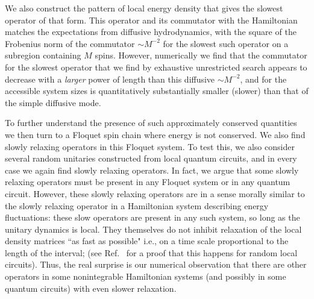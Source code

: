 \documentclass[twocolumn,superscriptaddress, prb]{revtex4-1}
\begin{document}
We also construct the pattern of local energy density that gives the slowest operator of that form.  This operator and its commutator with the Hamiltonian
matches the expectations from diffusive hydrodynamics, with the square of the Frobenius norm of the commutator $\sim M^{-2}$ for the slowest such operator on a subregion containing $M$ spins.
However, numerically we find that the commutator for the slowest operator that we find by exhaustive unrestricted search appears to decrease with a {\it larger} power of length than this diffusive $\sim M^{-2}$, and for the accessible system sizes is quantitatively substantially smaller (slower) than that of the simple diffusive mode.

To further understand the presence of such approximately conserved quantities we then turn to a Floquet spin chain where energy is not conserved.
We also find slowly relaxing operators in this Floquet system.
To test this, we also consider several random unitaries constructed from local quantum circuits, and in every case we again find slowly relaxing operators.
In fact, we argue that some slowly relaxing operators must be present in any Floquet system or in any quantum circuit.
However, these slowly relaxing operators are in a sense morally similar to the slowly relaxing operator in a Hamiltonian system describing energy fluctuations: these
slow operators are present in any such system, so long as the unitary dynamics is local.  They themselves do not inhibit relaxation of the local density matrices ``as fast as possible" i.e., on a time scale proportional to the length of the interval;
(see Ref.~ for a proof that this happens for random local circuits).
Thus, the real surprise is our numerical observation that there are other operators in some nonintegrable Hamiltonian systems (and possibly in some quantum circuits) with even slower relaxation.

\end{document}
